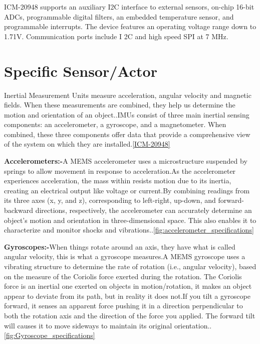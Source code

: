 ICM-20948 supports an auxiliary I2C interface to external sensors, on-chip 16-bit ADCs, programmable digital filters, an embedded temperature sensor, and programmable interrupts. The device features an operating voltage range down to 1.71V. Communication ports include I 2C and high speed SPI at 7 MHz.


\section{Specific Sensor/Actor}


 Inertial Measurement Units measure acceleration, angular velocity and magnetic fields. When these measurements are combined, they help us determine the motion and orientation of an object.\cite{221e:2025}.IMUs consist of three main inertial sensing components: an accelerometer, a gyroscope, and a magnetometer. When combined, these three components offer data that provide a comprehensive view of the system on which they are installed.\ref{ICM-20948}

\textbf{Accelerometers:-}A MEMS accelerometer uses a microstructure suspended by springs to allow movement in response to acceleration.As the accelerometer experiences acceleration, the mass within resists motion due to its inertia, creating an electrical output like voltage or current.By combining readings from its three axes (x, y, and z), corresponding to left-right, up-down, and forward-backward directions, respectively, the accelerometer can accurately determine an object’s motion and orientation in three-dimensional space. This also enables it to characterize and monitor shocks and vibrations.\cite{221e:2025}.\ref{fig:accelerometer_specifications}

\textbf{Gyroscopes:-}When things rotate around an axis, they have what is called angular velocity, this is what a gyroscope measures.A MEMS gyroscope uses a vibrating structure to determine the rate of rotation (i.e., angular velocity), based on the measure of the Coriolis force exerted during the rotation. The Coriolis force is an inertial one exerted on objects in motion/rotation, it makes an object appear to deviate from its path, but in reality it does not.If you tilt a gyroscope forward, it senses an apparent force pushing it in a direction perpendicular to both the rotation axis and the direction of the force you applied. The forward tilt will causes it to move sideways to maintain its original orientation.\cite{221e:2025}.\ref{fig:Gyroscope_specifications}

